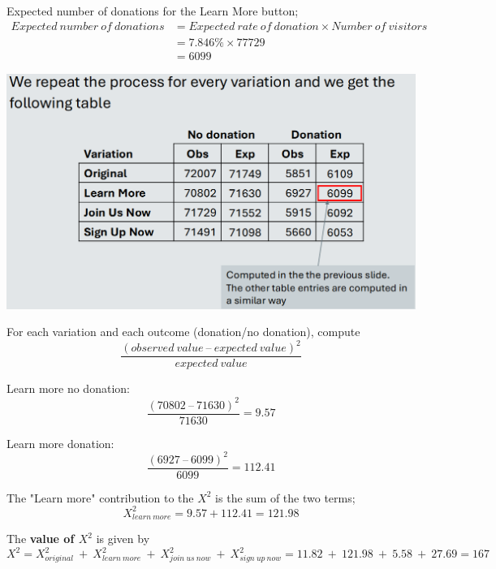 \documentclass[]{project_plan}
\begin{document}
Expected number of donations for the Learn More button;\\
\begin{align*}
  Expected\ number\ of\ donations & = Expected\ rate\ of\ donation \times Number\ of\ visitors \\
                                  & = 7.846\% \times 77729                                     \\
                                  & = 6099
\end{align*}


\includegraphics[width=\linewidth]{case_study_expected_values.png}

For each variation and each outcome (donation/no donation), compute\\
\begin{displaymath}\dfrac{(observed\ value\ –\ expected\ value)^2}{expected\ value}\end{displaymath}

Learn more no donation:\\
\begin{displaymath}\dfrac{(70802\ –\ 71630)^2}{71630} = 9.57\end{displaymath}

Learn more donation:\\
\begin{displaymath}\dfrac{(6927\ –\ 6099)^2}{6099} = 112.41\end{displaymath}

The "Learn more" contribution to the $X^2$ is the sum of the two terms;\\
\begin{displaymath}X^{2}_{learn\ more} = 9.57 + 112.41 = 121.98\end{displaymath}

The \textbf{value of $X^2$} is given by\\
\begin{displaymath}X^2 = X^{2}_{original}\ +\ X^{2}_{learn\ more}\ +\ X^{2}_{join\ us\ now}\ +\ X^{2}_{sign\ up\ now} = 11.82\ +\ 121.98\ +\ 5.58\ +\ 27.69 = 167\end{displaymath}
\end{document}
